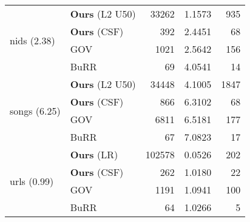 \begin{tabular}{ll rrr}
       \midrule\multirow{4}{*}{nids (2.38)} & \textbf{Ours} (L2 U50) &  33262 & 1.1573 &  935 \\
                                            &    \textbf{Ours} (CSF) &    392 & 2.4451 &   68 \\
                                            &                    GOV &   1021 & 2.5642 &  156 \\
                                            &                   BuRR &     69 & 4.0541 &   14 \\
      \midrule\multirow{4}{*}{songs (6.25)} & \textbf{Ours} (L2 U50) &  34448 & 4.1005 & 1847 \\
                                            &    \textbf{Ours} (CSF) &    866 & 6.3102 &   68 \\
                                            &                    GOV &   6811 & 6.5181 &  177 \\
                                            &                   BuRR &     67 & 7.0823 &   17 \\
       \midrule\multirow{4}{*}{urls (0.99)} &     \textbf{Ours} (LR) & 102578 & 0.0526 &  202 \\
                                            &    \textbf{Ours} (CSF) &    262 & 1.0180 &   22 \\
                                            &                    GOV &   1191 & 1.0941 &  100 \\
                                            &                   BuRR &     64 & 1.0266 &    5 \\
              
\midrule


\end{tabular}
